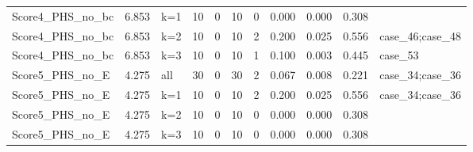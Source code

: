 \begin{longtable}{lllllllllll}
Score4\_PHS\_no\_bc & 6.853 & k=1 & 10 & 0 & 10 & 0 & 0.000 & 0.000 & 0.308 &  \\
Score4\_PHS\_no\_bc & 6.853 & k=2 & 10 & 0 & 10 & 2 & 0.200 & 0.025 & 0.556 & case\_46;case\_48 \\
Score4\_PHS\_no\_bc & 6.853 & k=3 & 10 & 0 & 10 & 1 & 0.100 & 0.003 & 0.445 & case\_53 \\
Score5\_PHS\_no\_E & 4.275 & all & 30 & 0 & 30 & 2 & 0.067 & 0.008 & 0.221 & case\_34;case\_36 \\
Score5\_PHS\_no\_E & 4.275 & k=1 & 10 & 0 & 10 & 2 & 0.200 & 0.025 & 0.556 & case\_34;case\_36 \\
Score5\_PHS\_no\_E & 4.275 & k=2 & 10 & 0 & 10 & 0 & 0.000 & 0.000 & 0.308 &  \\
Score5\_PHS\_no\_E & 4.275 & k=3 & 10 & 0 & 10 & 0 & 0.000 & 0.000 & 0.308 &  \\
\end{longtable}
